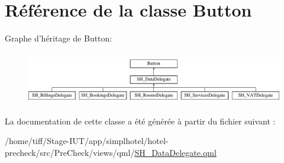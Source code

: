 \hypertarget{classButton}{\section{Référence de la classe Button}
\label{classButton}
}
Graphe d'héritage de Button\-:\begin{figure}[H]
\begin{center}
\leavevmode
\includegraphics[height=2.317241cm]{classButton}
\end{center}
\end{figure}


La documentation de cette classe a été générée à partir du fichier suivant \-:\begin{DoxyCompactItemize}
\item 
/home/tiff/\-Stage-\/\-I\-U\-T/app/simplhotel/hotel-\/precheck/src/\-Pre\-Check/views/qml/\hyperlink{SH__DataDelegate_8qml}{S\-H\-\_\-\-Data\-Delegate.\-qml}\end{DoxyCompactItemize}
